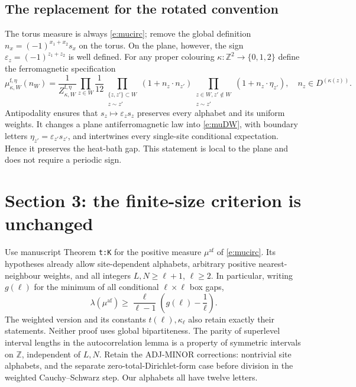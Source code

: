 \documentclass[11pt,reqno]{amsart}
\theoremstyle{definition}
\newcommand{\Z}{\mathbb Z}
\newcommand{\af}{\mathrm{af}}
\newcommand{\ff}{\mathrm f}
\begin{document}
\subsection{The replacement for the rotated convention}

The torus measure is always \eqref{e:mucirc}; remove the global definition
$n_x=(-1)^{x_1+x_2}s_x$ on the torus. On the plane, however, the sign
$\varepsilon_z=(-1)^{z_1+z_2}$ is well defined. For any proper colouring
$\kappa:\Z^2\to\{0,1,2\}$ define the ferromagnetic specification
\begin{equation}\label{e:muDW}
 \mu^{\ff,\eta}_{\kappa,W}(n_W)
 =\frac1{Z^{\ff,\eta}_{\kappa,W}}\prod_{z\in W}\frac1{12}
   \prod_{\substack{\{z,z'\}\subset W\\z\sim z'}}(1+n_z\cdot n_{z'})
   \prod_{\substack{z\in W,z'\notin W\\z\sim z'}}(1+n_z\cdot\eta_{z'}),
 \quad n_z\in D^{(\kappa(z))}.
\end{equation}
Antipodality ensures that $s_z\mapsto\varepsilon_zs_z$ preserves every
alphabet and its uniform weights. It changes a plane antiferromagnetic
law into \eqref{e:muDW}, with boundary letters
$\eta_{z'}=\varepsilon_{z'}s_{z'}$, and intertwines every single-site
conditional expectation. Hence it preserves the heat-bath gap.
This statement is local to the plane and does not require a periodic sign.

\section{Section 3: the finite-size criterion is unchanged}
\label{s:knabe}

Use manuscript Theorem \texttt{t:K} for the positive measure
$\mu^{\af}$ of \eqref{e:mucirc}. Its hypotheses already allow
site-dependent alphabets, arbitrary positive nearest-neighbour weights,
and all integers $L,N\ge\ell+1$, $\ell\ge2$. In particular, writing
$g(\ell)$ for the minimum of all conditional $\ell\times\ell$ box gaps,
\begin{equation}\label{e:K}
 \lambda(\mu^{\af})\ge\frac{\ell}{\ell-1}
                      \left(g(\ell)-\frac1\ell\right).
\end{equation}
The weighted version and its constants $t(\ell),\kappa_\ell$ also retain
exactly their statements. Neither proof uses global bipartiteness.
The parity of superlevel interval lengths in the autocorrelation lemma
is a property of symmetric intervals on $\Z$, independent of $L,N$.
Retain the ADJ-MINOR corrections: nontrivial site alphabets, and the
separate zero-total-Dirichlet-form case before division in the weighted
Cauchy--Schwarz step. Our alphabets all have twelve letters.
\end{document}
